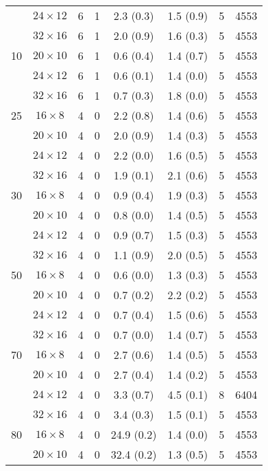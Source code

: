 \begin{longtable}{cccccccc}
    & $24 \times  12$ &  6 & 1 & 2.3 \; (0.3) & 1.5 \; (0.9) & 5 & 4553 \\
    & $32 \times  16$ &  6 & 1 & 2.0 \; (0.9) & 1.6 \; (0.3) & 5 & 4553 \\
\midrule
 10 & $20 \times  10$ &  6 & 1 & 0.6 \; (0.4) & 1.4 \; (0.7) & 5 & 4553 \\
    & $24 \times  12$ &  6 & 1 & 0.6 \; (0.1) & 1.4 \; (0.0) & 5 & 4553 \\
    & $32 \times  16$ &  6 & 1 & 0.7 \; (0.3) & 1.8 \; (0.0) & 5 & 4553 \\
\midrule
 25 & $16 \times   8$ &  4 & 0 & 2.2 \; (0.8) & 1.4 \; (0.6) & 5 & 4553 \\
    & $20 \times  10$ &  4 & 0 & 2.0 \; (0.9) & 1.4 \; (0.3) & 5 & 4553 \\
    & $24 \times  12$ &  4 & 0 & 2.2 \; (0.0) & 1.6 \; (0.5) & 5 & 4553 \\
    & $32 \times  16$ &  4 & 0 & 1.9 \; (0.1) & 2.1 \; (0.6) & 5 & 4553 \\
\midrule
 30 & $16 \times   8$ &  4 & 0 & 0.9 \; (0.4) & 1.9 \; (0.3) & 5 & 4553 \\
    & $20 \times  10$ &  4 & 0 & 0.8 \; (0.0) & 1.4 \; (0.5) & 5 & 4553 \\
    & $24 \times  12$ &  4 & 0 & 0.9 \; (0.7) & 1.5 \; (0.3) & 5 & 4553 \\
    & $32 \times  16$ &  4 & 0 & 1.1 \; (0.9) & 2.0 \; (0.5) & 5 & 4553 \\
\midrule
 50 & $16 \times   8$ &  4 & 0 & 0.6 \; (0.0) & 1.3 \; (0.3) & 5 & 4553 \\
    & $20 \times  10$ &  4 & 0 & 0.7 \; (0.2) & 2.2 \; (0.2) & 5 & 4553 \\
    & $24 \times  12$ &  4 & 0 & 0.7 \; (0.4) & 1.5 \; (0.6) & 5 & 4553 \\
    & $32 \times  16$ &  4 & 0 & 0.7 \; (0.0) & 1.4 \; (0.7) & 5 & 4553 \\
\midrule
 70 & $16 \times   8$ &  4 & 0 & 2.7 \; (0.6) & 1.4 \; (0.5) & 5 & 4553 \\
    & $20 \times  10$ &  4 & 0 & 2.7 \; (0.4) & 1.4 \; (0.2) & 5 & 4553 \\
    & $24 \times  12$ &  4 & 0 & 3.3 \; (0.7) & 4.5 \; (0.1) & 8 & 6404 \\
    & $32 \times  16$ &  4 & 0 & 3.4 \; (0.3) & 1.5 \; (0.1) & 5 & 4553 \\
\midrule
 80 & $16 \times   8$ &  4 & 0 & 24.9 \; (0.2) & 1.4 \; (0.0) & 5 & 4553 \\
    & $20 \times  10$ &  4 & 0 & 32.4 \; (0.2) & 1.3 \; (0.5) & 5 & 4553 \\

\end{longtable}
